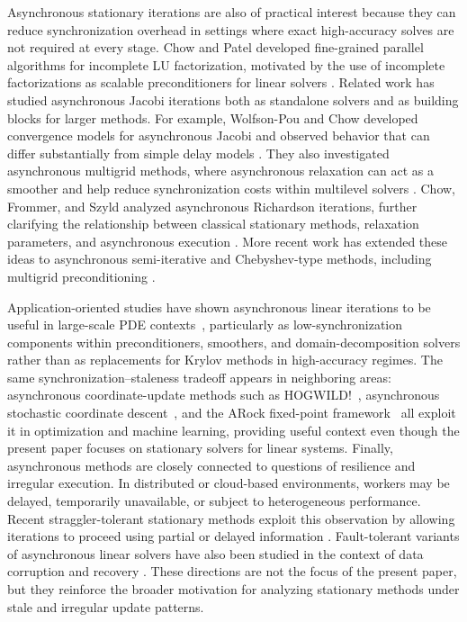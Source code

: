 \documentclass[pdflatex,sn-mathphys-num]{sn-jnl}%
\theoremstyle{thmstyleone}%
\theoremstyle{thmstyletwo}%
\theoremstyle{thmstylethree}%
\begin{document}
Asynchronous stationary iterations are also of practical interest because they
can reduce synchronization overhead in settings where exact high-accuracy solves
are not required at every stage.  Chow and Patel developed fine-grained parallel
algorithms for incomplete LU factorization, motivated by the use of incomplete
factorizations as scalable preconditioners for linear solvers
\cite{chow2015fine}.  Related work has studied asynchronous Jacobi iterations
both as standalone solvers and as building blocks for larger methods.  For
example, Wolfson-Pou and Chow developed convergence models for asynchronous
Jacobi and observed behavior that can differ substantially from simple delay
models \cite{wolfsonpou2018convergence}.  They also investigated asynchronous
multigrid methods, where asynchronous relaxation can act as a smoother and help
reduce synchronization costs within multilevel solvers
\cite{wolfsonpou2019multigrid}.  Chow, Frommer, and Szyld analyzed
asynchronous Richardson iterations, further clarifying the relationship between
classical stationary methods, relaxation parameters, and asynchronous execution
\cite{chow2021asynchronous}.  More recent work has extended these ideas to
asynchronous semi-iterative and Chebyshev-type methods, including multigrid
preconditioning \cite{wolfsonpou2025asynchronous}.

Application-oriented studies have shown asynchronous linear iterations to be
useful in large-scale PDE contexts~\cite{glusa2020scalable,kashi2021asynchronous,kashi2025effectiveness},
particularly as low-synchronization components within preconditioners,
smoothers, and domain-decomposition solvers rather than as replacements for
Krylov methods in high-accuracy regimes.
The same synchronization--staleness tradeoff appears in neighboring areas:
asynchronous coordinate-update methods such as HOGWILD!~\cite{recht2011hogwild},
asynchronous stochastic coordinate descent~\cite{liu2015asynchronous}, and the
ARock fixed-point framework~\cite{peng2016arock} all exploit it in optimization
and machine learning, providing useful context even though the present paper
focuses on stationary solvers for linear systems.
Finally, asynchronous methods are closely connected to questions of resilience
and irregular execution.  In distributed or cloud-based environments, workers
may be delayed, temporarily unavailable, or subject to heterogeneous performance.
Recent straggler-tolerant stationary methods exploit this observation by
allowing iterations to proceed using partial or delayed information
\cite{kalantzis2025straggler}.  Fault-tolerant variants of asynchronous linear
solvers have also been studied in the context of data corruption and recovery
\cite{coleman2021fault,coleman2026fault,vogl2024modifying}.  These directions are not the focus
of the present paper, but they reinforce the broader motivation for analyzing
stationary methods under stale and irregular update patterns.
\end{document}
